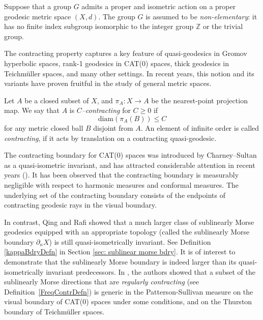 \documentclass{amsart}
\theoremstyle{definition}
\theoremstyle{remark}
\newcommand{\U}{ X}
\newcommand{\pka}{\partial_\kappa}
\begin{document}
Suppose that a group $G$ admits a proper and  isometric action on a proper
geodesic metric space $(\U, d)$. The group $G$ is assumed to be \textit{non-elementary}: it has  no finite index subgroup isomorphic to the integer group $\mathbb Z$ or the trivial group.   

The contracting property captures a key feature of quasi-geodesics in Gromov hyperbolic spaces, rank-1 geodesics in CAT(0) spaces, thick geodesics in Teichm{\"u}ller spaces, and many other settings. In recent years,   this notion and its variants have  proven fruitful in the study of general metric spaces. 


Let $A$ be a closed subset of $\U$, and $\pi_A: \U\to A$ be the   nearest-point projection map. We say that $A$ is \textit{$C$--contracting} for $C\ge 0$ if     $$\mathrm{diam}(\pi_A(B))\le C$$ for any metric closed ball $B$ disjoint from $A$.  An element of infinite order is called \textit{contracting}, if it acts by translation on a contracting quasi-geodesic.
  

 
 


The contracting boundary for CAT(0) spaces was introduced by Charney–Sultan \cite{ChaSul} as a quasi-isometric invariant, and has attracted considerable attention in recent years (\cite{Co17,QR22}). It has been observed that the contracting boundary is measurably negligible with respect to harmonic measures and conformal measures.
The  underlying set of the contracting boundary  consists of the endpoints of contracting geodesic rays in the visual boundary.


In contrast, Qing and Rafi \cite{QR22} showed that a much larger class of  sublinearly Morse geodesics equipped with an appropriate topology (called the sublinearly Morse boundary $\pka \U$) is still quasi-isometrically invariant. See Definition \ref{kappaBdryDefn} in Section \ref{sec: sublinear morse bdry}. It is of interest to demonstrate that the sublinearly Morse boundary is indeed larger than its quasi-isometrically  invariant predecessors. In \cite{GQR22}, the authors showed that a subset of the sublinearly Morse directions that are \emph{regularly contracting} (see Definition~\ref{FreqContrDefn}) is generic in the Patterson-Sullivan measure on the visual boundary of CAT(0) spaces under some conditions, and on the Thurston boundary of Teichm{\"u}ller spaces. 
\end{document}

